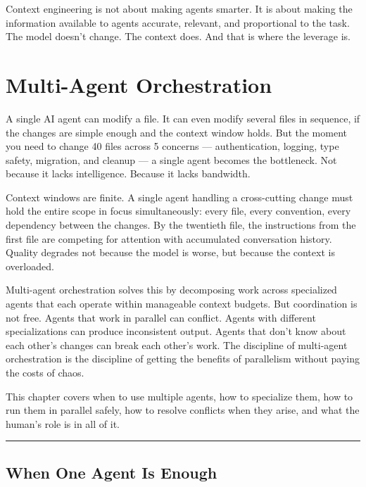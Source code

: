 \documentclass[
  a4paper,
  DIV=11,
  numbers=noendperiod]{scrreprt}
\begin{document}
Context engineering is not about making agents smarter. It is about
making the information available to agents accurate, relevant, and
proportional to the task. The model doesn't change. The context does.
And that is where the leverage is.

\chapter{Multi-Agent Orchestration}\label{multi-agent-orchestration}

A single AI agent can modify a file. It can even modify several files in
sequence, if the changes are simple enough and the context window holds.
But the moment you need to change 40 files across 5 concerns ---
authentication, logging, type safety, migration, and cleanup --- a
single agent becomes the bottleneck. Not because it lacks intelligence.
Because it lacks bandwidth.

Context windows are finite. A single agent handling a cross-cutting
change must hold the entire scope in focus simultaneously: every file,
every convention, every dependency between the changes. By the twentieth
file, the instructions from the first file are competing for attention
with accumulated conversation history. Quality degrades not because the
model is worse, but because the context is overloaded.

Multi-agent orchestration solves this by decomposing work across
specialized agents that each operate within manageable context budgets.
But coordination is not free. Agents that work in parallel can conflict.
Agents with different specializations can produce inconsistent output.
Agents that don't know about each other's changes can break each other's
work. The discipline of multi-agent orchestration is the discipline of
getting the benefits of parallelism without paying the costs of chaos.

This chapter covers when to use multiple agents, how to specialize them,
how to run them in parallel safely, how to resolve conflicts when they
arise, and what the human's role is in all of it.

\begin{center}\rule{0.5\linewidth}{0.5pt}\end{center}

\section{When One Agent Is Enough}\label{when-one-agent-is-enough}
\end{document}
